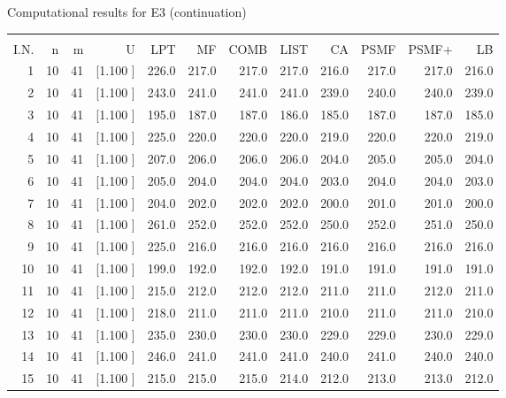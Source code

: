 \documentclass[12pt,a4paper]{article}
\begin{document}
\newpage
\begin{center}
 Computational results for E3 (continuation) {\tiny
\begin{tabular}{r r r r r r r r r r r r}\hline
    &   &   &          &        &        &        &        &        &        &        &       \\[-0.1in]
  I.N.  &  n  &  m  &  U  &  LPT  &  MF  &  COMB  &  LIST  &  CA  & PSMF &PSMF+ & LB \\[0.03in]
\hline
   1& 10& 41&[1.100     ]&   226.0&   217.0&   217.0&   217.0&   216.0&   217.0&   217.0&   216.0\\[-0.02in]
   2& 10& 41&[1.100     ]&   243.0&   241.0&   241.0&   241.0&   239.0&   240.0&   240.0&   239.0\\[-0.02in]
   3& 10& 41&[1.100     ]&   195.0&   187.0&   187.0&   186.0&   185.0&   187.0&   187.0&   185.0\\[-0.02in]
   4& 10& 41&[1.100     ]&   225.0&   220.0&   220.0&   220.0&   219.0&   220.0&   220.0&   219.0\\[-0.02in]
   5& 10& 41&[1.100     ]&   207.0&   206.0&   206.0&   206.0&   204.0&   205.0&   205.0&   204.0\\[-0.02in]
   6& 10& 41&[1.100     ]&   205.0&   204.0&   204.0&   204.0&   203.0&   204.0&   204.0&   203.0\\[-0.02in]
   7& 10& 41&[1.100     ]&   204.0&   202.0&   202.0&   202.0&   200.0&   201.0&   201.0&   200.0\\[-0.02in]
   8& 10& 41&[1.100     ]&   261.0&   252.0&   252.0&   252.0&   250.0&   252.0&   251.0&   250.0\\[-0.02in]
   9& 10& 41&[1.100     ]&   225.0&   216.0&   216.0&   216.0&   216.0&   216.0&   216.0&   216.0\\[-0.02in]
  10& 10& 41&[1.100     ]&   199.0&   192.0&   192.0&   192.0&   191.0&   191.0&   191.0&   191.0\\[-0.02in]
  11& 10& 41&[1.100     ]&   215.0&   212.0&   212.0&   212.0&   211.0&   211.0&   212.0&   211.0\\[-0.02in]
  12& 10& 41&[1.100     ]&   218.0&   211.0&   211.0&   211.0&   210.0&   211.0&   211.0&   210.0\\[-0.02in]
  13& 10& 41&[1.100     ]&   235.0&   230.0&   230.0&   230.0&   229.0&   229.0&   230.0&   229.0\\[-0.02in]
  14& 10& 41&[1.100     ]&   246.0&   241.0&   241.0&   241.0&   240.0&   241.0&   240.0&   240.0\\[-0.02in]
  15& 10& 41&[1.100     ]&   215.0&   215.0&   215.0&   214.0&   212.0&   213.0&   213.0&   212.0\\[-0.02in]

\end{tabular}}
\end{center}
\end{document}
